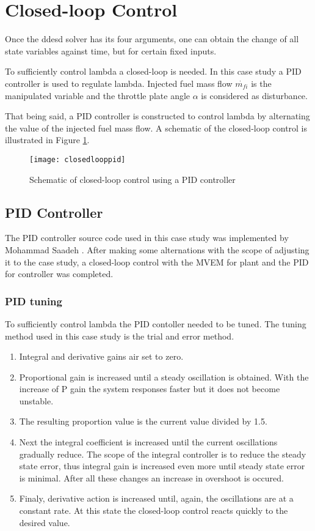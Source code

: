 \section{Closed-loop Control}

Once the ddesd solver has its four arguments, one can obtain the change of all state variables against time, but for certain fixed inputs.

To sufficiently control lambda a closed-loop is needed. In this case study a PID controller is used to regulate lambda. Injected fuel mass flow $\dot{m_{fi}}$ is the manipulated variable and the throttle plate angle $\alpha$ is considered as disturbance. 

That being said, a PID controller is constructed to control lambda by alternating the value of the injected fuel mass flow. A schematic of the closed-loop control is illustrated in Figure \ref{fig:closedlooppid}.

\begin{figure}[H]
    \centering
    \texttt{[image: closedlooppid]}
    \caption{Schematic of closed-loop control using a PID controller}
    \label{fig:closedlooppid}
\end{figure}


\subsection{PID Controller}
The PID controller source code used in this case study was implemented by  Mohammad Saadeh \cite{pidcode}. After making some alternations with the scope of adjusting it to the case study, a closed-loop control with the MVEM for plant and the PID for controller was completed. 


\subsubsection{PID tuning}
To sufficiently control lambda the PID contoller needed to be tuned. The tuning method used in this case study is the trial and error method.

\begin{enumerate}
	\item Integral and derivative gains air set to zero.
	\item Proportional gain is increased until a steady oscillation is obtained. With the increase of P gain the system responses faster but it does not become unstable.
	\item The resulting proportion value is the current value divided by 1.5.
	\item Next the integral coefficient is increased until the current oscillations gradually reduce. The scope of the integral controller is to reduce the steady state error, thus integral gain is increased even more until steady state error is minimal. After all these changes an increase in overshoot is occured.
	\item Finaly, derivative action is increased until, again, the oscillations are at a constant rate. At this state the closed-loop control reacts quickly to the desired value.
\end{enumerate}
